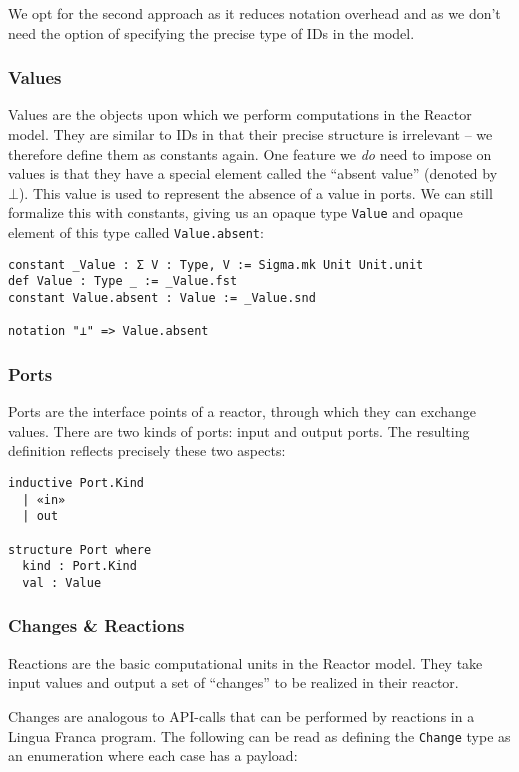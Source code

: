 We opt for the second approach as it reduces notation overhead and as we don't need the option of specifying the precise type of IDs in the model.

\subsubsection{Values}

Values are the objects upon which we perform computations in the Reactor model.
They are similar to IDs in that their precise structure is irrelevant -- we therefore define them as constants again.
One feature we \emph{do} need to impose on values is that they have a special element called the ``absent value'' (denoted by $\bot$).
This value is used to represent the absence of a value in ports.
We can still formalize this with constants, giving us an opaque type \lstinline{Value} and opaque element of this type called \lstinline{Value.absent}:

\begin{lstlisting}
constant _Value : Σ V : Type, V := Sigma.mk Unit Unit.unit
def Value : Type _ := _Value.fst
constant Value.absent : Value := _Value.snd

notation "⊥" => Value.absent
\end{lstlisting}

\subsubsection{Ports}

Ports are the interface points of a reactor, through which they can exchange values.
There are two kinds of ports: input and output ports.
The resulting definition reflects precisely these two aspects:

\begin{lstlisting}
inductive Port.Kind
  | «in» 
  | out

structure Port where
  kind : Port.Kind
  val : Value
\end{lstlisting}

\subsubsection{Changes \& Reactions}

Reactions are the basic computational units in the Reactor model. 
They take input values and output a set of ``changes'' to be realized in their reactor.

Changes are analogous to API-calls that can be performed by reactions in a Lingua Franca program.
The following can be read as defining the \lstinline{Change} type as an enumeration where each case has a payload:

